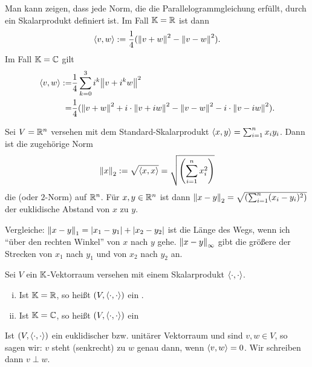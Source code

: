 \begin{bemerkung}
	\label{bem:3.8}
	Man kann zeigen, dass jede Norm, die die Parallelogrammgleichung erfüllt, durch ein Skalarprodukt definiert ist.
	Im Fall $\mathbb{K} = \mathbb{R}$ ist dann
	\[
		\left\langle v,w\right\rangle := \frac{1}{4} (\left\lVert v+w\right\rVert^2 - \left\lVert v-w\right\rVert^2).
	\]
	Im Fall $\mathbb{K}= \mathbb{C}$ gilt
	\begin{align*}
		\sk{v,w} := &\frac{1}{4} \sum_{k=0}^{3} i^k \no{v+i^kw}^2 \\
		= &\frac{1}{4} (\no{v+w}^2 + i \cdot \no{v+iw}^2 - \no{v-w}^2 - i \cdot \no{v-iw}^2).
	\end{align*}
\end{bemerkung}

\begin{beispiel}
	\label{bsp:3.9}
	Sei $V = \mathbb{R}^n$ versehen mit dem Standard-Skalarprodukt $\left\langle x,y\right\rangle = \sum_{i=1}^{n} x_iy_i$.
	Dann ist die zugehörige Norm
	\[
		\left\lVert x\right\rVert_2 := \sqrt{\left\langle x,x\right\rangle} = \sqrt{\left(\sum_{i=1}^{n} x_i^2\right)}
	\]
	die  (oder $2$-Norm) auf $\mathbb{R}^n$.
	Für $x,y \in \mathbb{R}^n$ ist dann $\left\lVert x-y\right\rVert_2 = \sqrt{\left(\sum_{i=1}^{n} (x_i-y_i)^2\right)}$ der euklidische Abstand von $x$ zu $y$. 
	
	Vergleiche: $\left\lVert x-y\right\rVert_1 = \lvert x_1-y_1\rvert + \lvert x_2-y_2\rvert$ ist die Länge des Wegs, wenn ich \enquote{über den rechten Winkel} von $x$ nach $y$ gehe.
	$\left\lVert x-y\right\rVert_\infty$ gibt die größere der Strecken von $x_1$ nach $y_1$ und von $x_2$ nach $y_2$ an.
\end{beispiel}

\begin{definition}
	\label{def:3.10}
	Sei $V$ ein $\mathbb{K}$-Vektorraum versehen mit einem Skalarprodukt $\left\langle\cdot,\cdot\right\rangle$.
	\begin{enumerate}[(i)]
		\item Ist $\mathbb{K}= \mathbb{R}$, so heißt $(V,\left\langle\cdot,\cdot\right\rangle)$ ein .
		\item Ist $\mathbb{K} = \mathbb{C}$, so heißt $(V,\left\langle\cdot,\cdot\right\rangle)$ ein 
	\end{enumerate}
	Ist $(V,\left\langle\cdot,\cdot\right\rangle)$ ein euklidischer bzw. unitärer Vektorraum und sind $v,w \in V$, so sagen wir:
	$v$ steht  (senkrecht) zu $w$ genau dann, wenn $\left\langle v,w\right\rangle = 0$.
	Wir schreiben dann $v \perp w$.
\end{definition}

